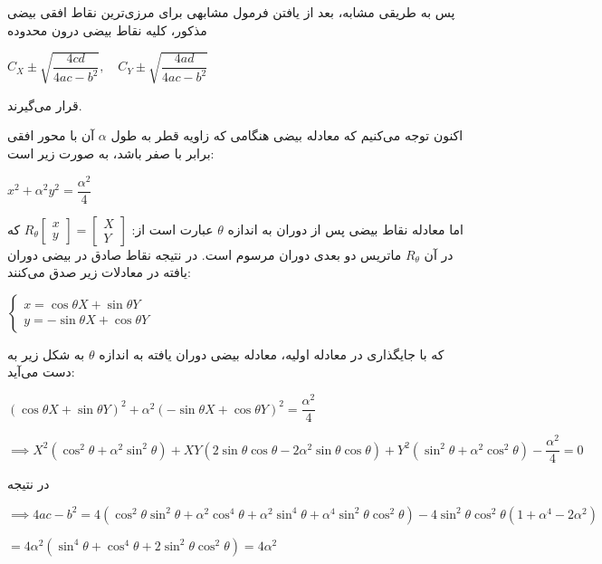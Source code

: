 \documentclass{scribe-cgenomics}
\begin{document}
پس به طریقی مشابه، بعد از یافتن فرمول مشابهی برای مرزی‌ترین نقاط افقی بیضی مذکور، کلیه نقاط بیضی درون محدوده

\begin{center}
$
C_X \pm \sqrt{\dfrac{4cd}{4ac-b^2}}, \quad
C_Y \pm \sqrt{\dfrac{4ad}{4ac-b^2}}
$
\end{center}

قرار می‌گیرند.

اکنون توجه می‌کنیم که معادله بیضی هنگامی که زاویه قطر به طول
$\alpha$
آن با محور افقی برابر با صفر باشد، به صورت زیر است:

\begin{center}
$
x^2 + \alpha^2 y^2 = \dfrac{\alpha^2}{4}
$
\end{center}

اما معادله نقاط بیضی پس از دوران به اندازه
$\theta$
عبارت است از:
$R_{\theta} 
\begin{bmatrix}
x \\ y
\end{bmatrix}
 = \begin{bmatrix}
 X \\ Y
 \end{bmatrix}
 $
 که در آن
 $R_{\theta}$
 ماتریس دو بعدی دوران مرسوم است. در نتیجه نقاط صادق در بیضی دوران یافته در معادلات زیر صدق می‌کنند:
 
\begin{center}
$
\begin{cases}
x = \cos \theta X + \sin \theta Y \\
y = -\sin \theta X + \cos \theta Y
\end{cases}
$
\end{center}

که با جایگذاری در معادله اولیه، معادله بیضی دوران یافته به اندازه
$\theta$
به شکل زیر به دست می‌آید:

\begin{center}
$
(\cos \theta X + \sin \theta Y)^2 + \alpha^2 (-\sin \theta X + \cos \theta Y)^2 = \dfrac{\alpha^2}{4}
$

$
\implies X^2(\cos^2 \theta + \alpha^2 \sin^2 \theta) + 
XY (2\sin \theta \cos \theta - 2\alpha^2 \sin \theta \cos \theta) + 
Y^2 (\sin^2 \theta + \alpha^2 \cos^2 \theta) - \dfrac{\alpha^2}{4} = 0
$
\end{center}

در نتیجه

\begin{center}
$
\implies 4ac - b^2 = 4 (\cos^2 \theta \sin^2 \theta + \alpha^2 \cos^4 \theta + \alpha^2 \sin^4 \theta + \alpha^4 \sin^2 \theta \cos^2 \theta) - 4\sin^2 \theta \cos^2 \theta (1 + \alpha^4 -2\alpha^2)
$

$
= 4 \alpha^2 (\sin^4 \theta + \cos^4 \theta + 2\sin^2 \theta \cos^2 \theta) = 4\alpha^2
$
\end{center}
\end{document}
